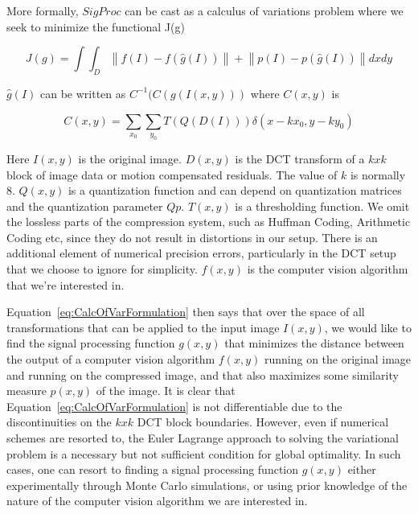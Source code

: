 \documentclass{article}
\begin{document}
\begin{itemize}
More formally, $SigProc$ can be cast as a calculus of variations problem where we seek to minimize the functional J(g)

\begin{equation}
\label{eq:CalcOfVarFormulation}
J(g)=\int\int_D \left\|f(I) - f(\hat{g}(I)) \right\|  +  \left\|p(I) - p(\hat{g}(I)) \right\| dxdy
\end{equation}

$\hat{g}(I)$ can be written as $C^{-1}(C(g(I(x,y)))$ where $C(x,y)$ is 

\begin{equation}
\label{eq:DCT}
C(x,y) = \sum_{x_0}\sum_{y_0}T(Q(D(I)))\delta(x-kx_0, y-ky_0)
\end{equation}

Here $I(x,y)$ is the original image.  $D(x,y)$ is the DCT transform of a $kxk$ block of image data or motion compensated residuals.  The value of $k$ is normally 8.  $Q(x,y)$ is a quantization function and can depend on quantization matrices and the quantization parameter $Qp$. $T(x,y)$  is a thresholding function.  We omit the lossless parts of the compression system, such as Huffman Coding, Arithmetic Coding etc, since they do not result in distortions in our setup.  There is an additional element of numerical precision errors, particularly in the DCT setup that we choose to ignore for simplicity.  $f(x,y)$ is the computer vision algorithm that we're interested in.

Equation~\ref{eq:CalcOfVarFormulation} then says that over the space of all transformations that can be applied to the input image $I(x,y)$, we would like to find the signal processing function $g(x,y)$ that minimizes the distance between the output of a computer vision algorithm $f(x,y)$ running on the original image and running on the compressed image, and that also maximizes some similarity measure $p(x,y)$ of the image.  It is clear that Equation~\ref{eq:CalcOfVarFormulation} is not differentiable due to the discontinuities on the $kxk$ DCT block boundaries.  However, even if numerical schemes are resorted to, the Euler Lagrange approach to solving the variational problem is a necessary but not sufficient condition for global optimality.  In such cases, one can resort to finding a signal processing function $g(x,y)$ either experimentally through Monte Carlo simulations, or using prior knowledge of the nature of the computer vision algorithm we are interested in.

\begin{figure}%
			\centering


\end{figure}
\end{itemize}
\end{document}
